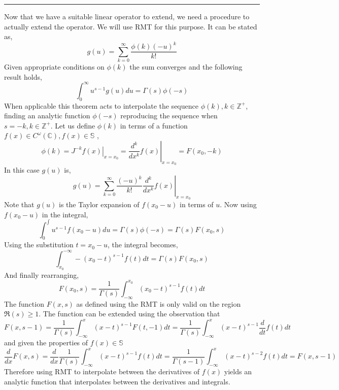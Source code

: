 \documentclass[%
 preprint,
 amsmath, amssymb, aps, pra, 10pt
]{revtex4-2}
\begin{document}
\noindent\rule{\textwidth}{1pt}
Now that we have a suitable linear operator to extend, we need a procedure to actually extend the operator. We will use RMT for this purpose. It can be stated as,
\[g(u) = \sum_{k=0}^\infty \frac{\phi(k)(-u)^k}{k!}\]
Given appropriate conditions on $\phi(k)$ the sum converges and the following result holds,
\[\int_0^{\infty} u^{s-1}g(u)du = \Gamma(s)\phi(-s)\]
When applicable this theorem acts to interpolate the sequence $\phi(k), k \in \mathbb{Z}^+$, finding an analytic function $\phi(-s)$ reproducing the sequence when $s = -k, k \in \mathbb{Z}^+$. Let us define $\phi(k)$ in terms of a function $f(x) \in C^{\omega}(\mathbb{C}), f(x) \in \mathbb{S}$ ,
\[\phi(k) = \left. J^{-k}f(x)\right|_{x = x_0} = \left. \frac{d^k}{dx^k}f(x) \right|_{x = x_0} = F(x_0, -k)\]
In this case $g(u)$ is,
\[g(u) = \sum_{k=0}^\infty \frac{(-u)^k}{k!} \left. \frac{d^k}{dx^k}f(x)\right|_{x=x_0}\]
Note that $g(u)$ is the Taylor expansion of $f(x_0 - u)$ in terms of $u$. Now using $f(x_0 - u)$ in the integral,
\[\int_0^{\int} u^{s-1}f(x_0 - u)du = \Gamma(s)\phi(-s) = \Gamma(s)F(x_0, s)\]
Using the substitution $t = x_0 - u$, the integral becomes,
\[\int_{x_0}^{-\infty} -(x_0 - t)^{s-1}f(t)dt = \Gamma(s)F(x_0, s)\]
And finally rearranging,
\[F(x_0, s) = \frac{1}{\Gamma(s)} \int_{-\infty}^{x_0} (x_0 - t)^{s-1} f(t)dt\]
The function $F(x, s)$ as defined using the RMT is only valid on the region $\mathfrak{R}(s) \geq 1$. The function can be extended using the observation that
\[F(x, s-1) = \frac{1}{\Gamma(s)} \int_{-\infty}^{x} (x - t)^{s-1} F(t, -1)dt = \frac{1}{\Gamma(s)} \int_{-\infty}^{x} (x - t)^{s-1} \frac{d}{dt}f(t)dt\]
and given the properties of $f(x) \in \mathbb{S}$
\[\frac{d}{dx}F(x, s) = \frac{d}{dx}\frac{1}{\Gamma(s)} \int_{-\infty}^{x} (x - t)^{s-1} f(t)dt = \frac{1}{\Gamma(s - 1)} \int_{-\infty}^{x} (x - t)^{s - 2} f(t)dt = F(x, s - 1)\]
Therefore using RMT to interpolate between the derivatives of $f(x)$ yields an analytic function that interpolates between the derivatives and integrals.
\end{document}
